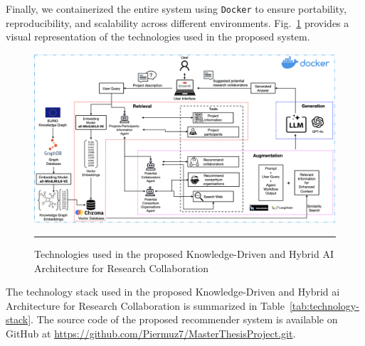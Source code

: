 Finally, we containerized the entire system using \texttt{Docker} to ensure portability, reproducibility, and scalability across different environments.
Fig.~\ref{fig:proposed-system-graphRAG-technologies} provides a visual representation of the technologies used in the proposed system.

\begin{figure}[htbp]
    \centering
 \includegraphics[width=.8\textwidth]{figures/implementation/proposed-system-graphRAG-technologies.png}
     \rule{35em}{0.5pt}
    \caption{Technologies used in the proposed Knowledge-Driven and Hybrid AI Architecture for Research Collaboration}
 \label{fig:proposed-system-graphRAG-technologies}
\end{figure}

The technology stack used in the proposed Knowledge-Driven and Hybrid \gls{ai} Architecture for Research Collaboration is summarized in Table~\ref{tab:technology-stack}.
The source code of the proposed recommender system is available on GitHub at \url{https://github.com/Piermuz7/MasterThesisProject.git}.

